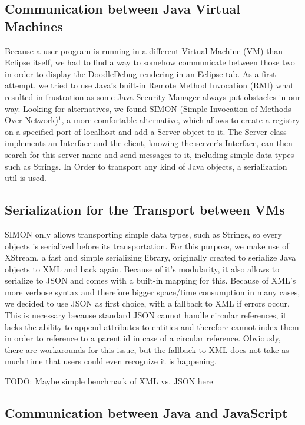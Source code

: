 \documentclass{report}
\begin{document}
\subsection*{Communication between Java Virtual Machines}
Because a user program is running in a different Virtual Machine (VM) than Eclipse itself, we had to find a way to somehow communicate between those two in order to display the DoodleDebug rendering in an Eclipse tab. As a first attempt, we tried to use Java's built-in Remote Method Invocation (RMI) what resulted in frustration as some Java Security Manager always put obstacles in our way. Looking for alternatives, we found SIMON (Simple Invocation of Methods Over Network)$^1$, a more comfortable alternative, which allows to create a registry on a specified port of localhost and add a Server object to it. The Server class implements an Interface and the client, knowing the server's Interface, can then search for this server name and send messages to it, including simple data types such as Strings. In Order to transport any kind of Java objects, a serialization util is used.

\subsection*{Serialization for the Transport between VMs}
SIMON only allows transporting simple data types, such as Strings, so every objects is serialized before its transportation. For this purpose, we make use of XStream, a fast and simple serializing library, originally created to serialize Java objects to XML and back again. Because of it's modularity, it also allows to serialize to JSON and comes with a built-in mapping for this. Because of XML's more verbose syntax and therefore bigger space/time consumption in many cases, we decided to use JSON as first choice, with a fallback to XML if errors occur. This is necessary because standard JSON cannot handle circular references, it lacks the ability to append attributes to entities and therefore cannot index them in order to reference to a parent id in case of a circular reference. Obviously, there are workarounds for this issue, but the fallback to XML does not take as much time that users could even recognize it is happening.

TODO: Maybe simple benchmark of XML vs. JSON here

\subsection*{Communication between Java and JavaScript}
\end{document}
